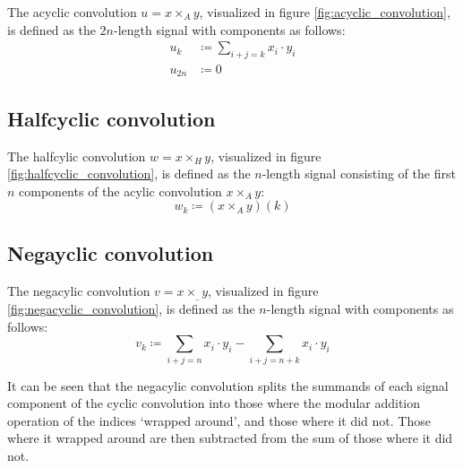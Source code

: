 The acyclic convolution $u = x \times_A y$, visualized in figure
\ref{fig:acyclic_convolution}, is defined as the $2n$-length signal with
components as follows:
\begin{align*}
		u_k & \coloneqq \sum_{i + j = k} x_i \cdot y_i \\
		u_{2n} & \coloneqq 0
\end{align*}

\subsection{Halfcyclic convolution}

The halfcylic convolution $w = x \times_H y$, visualized in figure
\ref{fig:halfcyclic_convolution}, is defined as the $n$-length signal
consisting of the first $n$ components of the acylic convolution $x \times_A
y$:
\[
		w_k \coloneqq (x \times_A y)(k)
\]

\subsection{Negayclic convolution}

The negacylic convolution $v = x \times_\_ y$, visualized in figure
\ref{fig:negacyclic_convolution}, is defined as the $n$-length signal with
components as follows:
\[
		v_k \coloneqq \sum_{i + j = n} x_i \cdot y_i - \sum_{i + j = n + k} x_i \cdot y_i
\]

It can be seen that the negacylic convolution splits the summands of each
signal component of the cyclic convolution into those where the modular
addition operation of the indices `wrapped around', and those where it did not.
Those where it wrapped around are then subtracted from the sum of those where
it did not.


